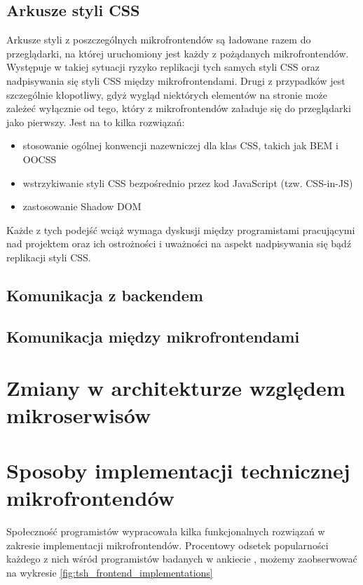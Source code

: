 \documentclass{SGGW-thesis}
\begin{document}
    \subsection{Arkusze styli CSS}
    Arkusze styli z poszczególnych mikrofrontendów są ładowane razem do przeglądarki, na której uruchomiony jest każdy z pożądanych mikrofrontendów. Występuje w takiej sytuacji ryzyko replikacji tych samych styli CSS oraz nadpisywania się styli CSS między mikrofrontendami. Drugi z przypadków jest szczególnie kłopotliwy, gdyż wygląd niektórych elementów na stronie może zależeć wyłącznie od tego, który z mikrofrontendów załaduje się do przeglądarki jako pierwszy. Jest na to kilka rozwiązań:

    \begin{itemize}
      \item stosowanie ogólnej konwencji nazewniczej dla klas CSS, takich jak BEM i OOCSS
      \item wstrzykiwanie styli CSS bezpośrednio przez kod JavaScript (tzw. CSS-in-JS)
      \item zastosowanie Shadow DOM
    \end{itemize}

    Każde z tych podejść wciąż wymaga dyskusji między programistami pracującymi nad projektem oraz ich ostrożności i uważności na aspekt nadpisywania się bądź replikacji styli CSS.

    \subsection{Komunikacja z backendem}
    \subsection{Komunikacja między mikrofrontendami}
  \section{Zmiany w architekturze względem mikroserwisów}
  \section{Sposoby implementacji technicznej mikrofrontendów}
  Społeczność programistów wypracowała kilka funkcjonalnych rozwiązań w zakresie implementacji mikrofrontendów. Procentowy odsetek popularności każdego z nich wśród programistów badanych w ankiecie \cite{tsh_2022}, możemy zaobserwować na wykresie \ref{fig:tsh_frontend_implementations}
  
\end{document}
